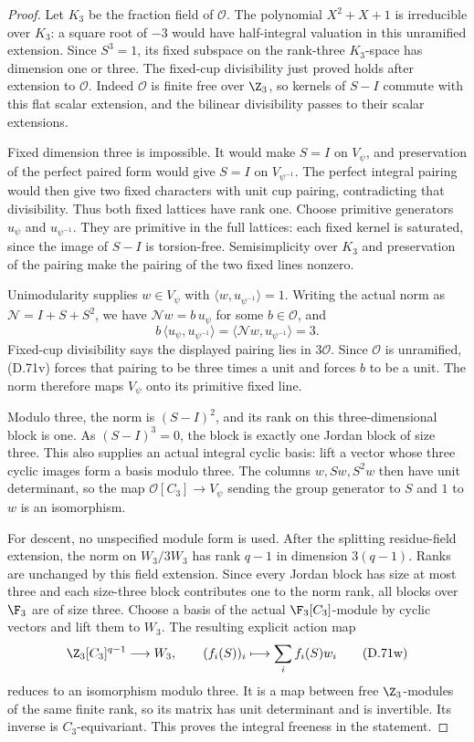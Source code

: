 \begin{proof}
Let $K_3$ be the fraction field of
$\mathcal O$.
The polynomial $X^2+X+1$ is irreducible
over $K_3$: a square root of $-3$
would have half-integral valuation
in this unramified extension.
Since $S^3=1$, its fixed subspace
on the rank-three $K_3$-space has
dimension one or three.
The fixed-cup divisibility just proved
holds after extension to $\mathcal O$.
Indeed $\mathcal O$ is finite free
over $\Z_3$, so kernels of $S-I$
commute with this flat scalar
extension, and the bilinear divisibility
passes to their scalar extensions.

Fixed dimension three is impossible.
It would make $S=I$ on $V_\psi$,
and preservation of the perfect paired
form would give $S=I$ on
$V_{\psi^{-1}}$.
The perfect integral pairing would
then give two fixed characters with
unit cup pairing, contradicting that
divisibility.
Thus both fixed lattices have rank one.
Choose primitive generators
$u_\psi$ and $u_{\psi^{-1}}$.
They are primitive in the full lattices:
each fixed kernel is saturated, since
the image of $S-I$ is torsion-free.
Semisimplicity over $K_3$ and preservation
of the pairing make the pairing of the
two fixed lines nonzero.

Unimodularity supplies
$w\in V_\psi$ with
$\langle w,u_{\psi^{-1}}\rangle=1$.
Writing the actual norm as
$\mathcal N=I+S+S^2$, we have
$\mathcal Nw=b\,u_\psi$ for some
$b\in\mathcal O$, and
\[
       b\,\langle u_\psi,u_{\psi^{-1}}\rangle
          =\langle\mathcal Nw,u_{\psi^{-1}}\rangle
          =3 .
                                                               \tag{D.71v}
\]
Fixed-cup divisibility says the
displayed pairing lies in $3\mathcal O$.
Since $\mathcal O$ is unramified,
(D.71v) forces that pairing to be
three times a unit and forces $b$
to be a unit.
The norm therefore maps $V_\psi$
onto its primitive fixed line.

Modulo three, the norm is
$(S-I)^2$, and its rank on this
three-dimensional block is one.
As $(S-I)^3=0$, the block is exactly
one Jordan block of size three.
This also supplies an actual integral
cyclic basis: lift a vector whose
three cyclic images form a basis
modulo three. The columns
$w,Sw,S^2w$ then have unit determinant,
so the map
$\mathcal O[C_3]\to V_\psi$ sending
the group generator to $S$ and $1$
to $w$ is an isomorphism.

For descent, no unspecified module
form is used.
After the splitting residue-field
extension, the norm on $W_3/3W_3$
has rank $q-1$ in dimension $3(q-1)$.
Ranks are unchanged by this field
extension. Since every Jordan block
has size at most three and each
size-three block contributes one
to the norm rank, all blocks over
$\F_3$ are of size three.
Choose a basis of the actual
$\F_3[C_3]$-module by cyclic
vectors and lift them to $W_3$.
The resulting explicit action map
\[
 \Z_3[C_3]^{q-1}\longrightarrow W_3,\qquad
             (f_i(S))_i\longmapsto\sum_i f_i(S)w_i
                                                               \tag{D.71w}
\]
reduces to an isomorphism modulo three.
It is a map between free $\Z_3$-modules
of the same finite rank, so its matrix
has unit determinant and is invertible.
Its inverse is $C_3$-equivariant.
This proves the integral freeness
in the statement.


\end{proof}
